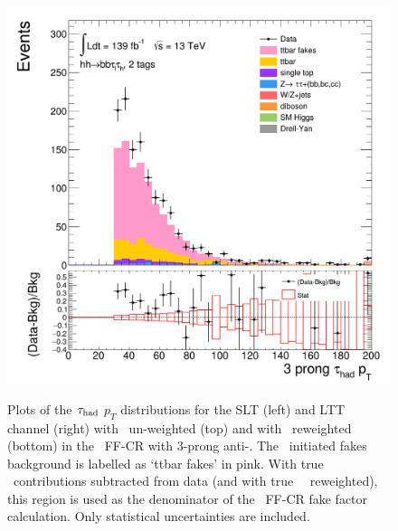 \begin{figure}[htbp]
\includegraphics[width=.45\textwidth]{DiHiggs/plots/FF_CRs/ttbarCR_LTT_weighted/HNone/BDTVarsHighMbb/2/C_2tag2pjet_0ptv_TauPt3P.png}\\
\caption{Plots of the $\tau_{\mathrm{had}}$ $p_T$ distributions for the SLT (left) and LTT channel (right) with \ttbar\ un-weighted (top)
and with \ttbar\ reweighted (bottom) in the \ttbar\ FF-CR with 3-prong anti-\tauhad.
The \ttbar\ initiated fakes background is labelled as `ttbar fakes' in pink.
With true \tauhad\ contributions subtracted from data (and with true \tauhad\ \ttbar\ reweighted), 
this region is used as the denominator of the \ttbar\ FF-CR fake factor calculation. 
Only statistical uncertainties are included.}
\label{fig:ttbarCR_3}
\end{figure} 
